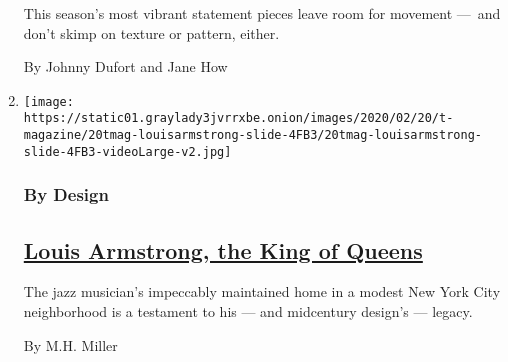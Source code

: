 \begin{enumerate}
  This season's most vibrant statement pieces leave room for movement
  ---~and don't skimp on texture or pattern, either.

  By Johnny Dufort and Jane How
\item
  \texttt{[image: https://static01.graylady3jvrrxbe.onion/images/2020/02/20/t-magazine/20tmag-louisarmstrong-slide-4FB3/20tmag-louisarmstrong-slide-4FB3-videoLarge-v2.jpg]}

  \hypertarget{by-design}{%
  \subsubsection{By Design}\label{by-design}}

  \hypertarget{louis-armstrong-the-king-of-queens}{%
  \subsection{\texorpdfstring{\href{/2020/02/20/t-magazine/louis-armstrong-home-queens.html}{Louis
  Armstrong, the King of
  Queens}}{Louis Armstrong, the King of Queens}}\label{louis-armstrong-the-king-of-queens}}

  The jazz musician's impeccably maintained home in a modest New York
  City neighborhood is a testament to his --- and midcentury design's
  --- legacy.

  By M.H. Miller
\end{enumerate}

